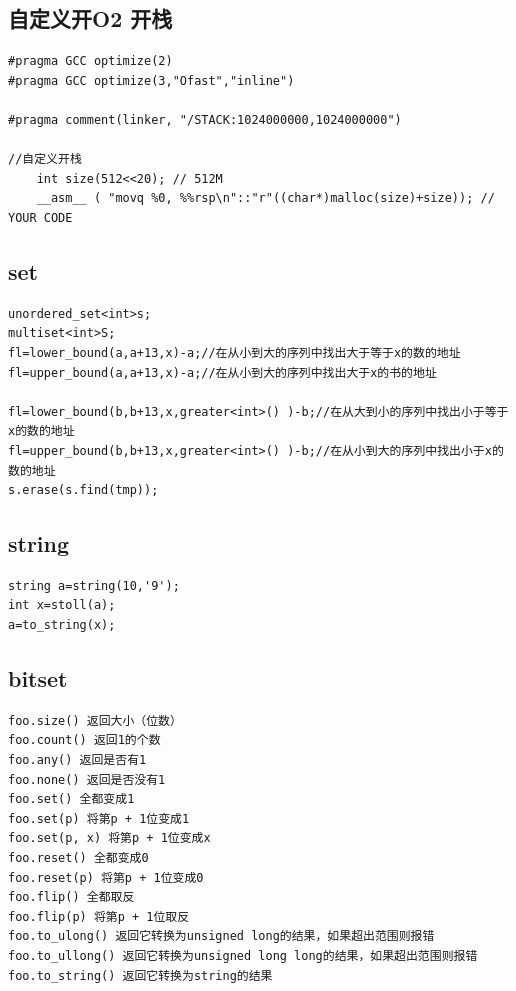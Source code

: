 \documentclass[12pt, a4paper, oneside]{ctexart}
\begin{document}
\newpage
\subsection{自定义开O2 开栈} 
\begin{lstlisting}
#pragma GCC optimize(2)
#pragma GCC optimize(3,"Ofast","inline")

#pragma comment(linker, "/STACK:1024000000,1024000000")

//自定义开栈
	int size(512<<20); // 512M
    __asm__ ( "movq %0, %%rsp\n"::"r"((char*)malloc(size)+size)); // YOUR CODE
\end{lstlisting}

\newpage
\subsection{set} 
\begin{lstlisting}
unordered_set<int>s;
multiset<int>S;
fl=lower_bound(a,a+13,x)-a;//在从小到大的序列中找出大于等于x的数的地址 
fl=upper_bound(a,a+13,x)-a;//在从小到大的序列中找出大于x的书的地址

fl=lower_bound(b,b+13,x,greater<int>() )-b;//在从大到小的序列中找出小于等于x的数的地址 
fl=upper_bound(b,b+13,x,greater<int>() )-b;//在从小到大的序列中找出小于x的数的地址 
s.erase(s.find(tmp));
\end{lstlisting}

\subsection{string} 
\begin{lstlisting}
string a=string(10,'9'); 
int x=stoll(a);
a=to_string(x);
\end{lstlisting}



\subsection{bitset} 
\begin{lstlisting}
foo.size() 返回大小（位数）
foo.count() 返回1的个数
foo.any() 返回是否有1
foo.none() 返回是否没有1
foo.set() 全都变成1
foo.set(p) 将第p + 1位变成1
foo.set(p, x) 将第p + 1位变成x
foo.reset() 全都变成0
foo.reset(p) 将第p + 1位变成0
foo.flip() 全都取反
foo.flip(p) 将第p + 1位取反
foo.to_ulong() 返回它转换为unsigned long的结果，如果超出范围则报错
foo.to_ullong() 返回它转换为unsigned long long的结果，如果超出范围则报错
foo.to_string() 返回它转换为string的结果
\end{lstlisting}
\end{document}
